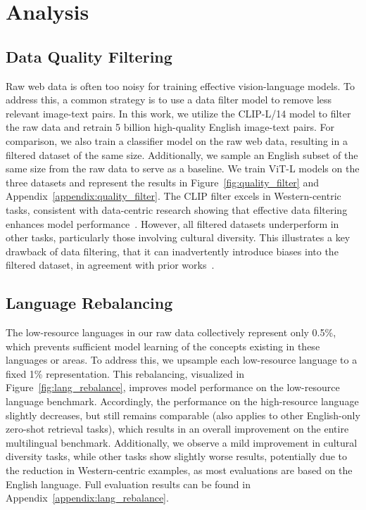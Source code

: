 \section{Analysis}

\subsection{Data Quality Filtering}
\label{sec:data_filter}

Raw web data is often too noisy for training effective vision-language models. To address this, a common strategy is to use a data filter model to remove less relevant image-text pairs. In this work, we utilize the CLIP-L/14 model to filter the raw data and retrain 5 billion high-quality English image-text pairs.
For comparison, we also train a classifier model on the raw web data, resulting in a filtered dataset of the same size. Additionally, we sample an English subset of the same size from the raw data to serve as a baseline.
We train ViT-L models on the three datasets and represent the results in Figure~\ref{fig:quality_filter} and Appendix~\ref{appendix:quality_filter}. The CLIP filter excels in Western-centric tasks, consistent with data-centric research showing that effective data filtering enhances model performance~\citep{fang2023data,cao2023less,maini2023t,abbas2023semdedup}. However, all filtered datasets underperform in other tasks, particularly those involving cultural diversity. This illustrates a key drawback of data filtering, that it can inadvertently introduce biases into the filtered dataset, in agreement with prior works~\citep{birhane2021multimodal,pouget2024no,garcia2023uncurated}.



\subsection{Language Rebalancing}
\label{sec:lang_rebalance}

The low-resource languages in our raw data collectively represent only 0.5\%, which prevents sufficient model learning of the concepts existing in these languages or areas. To address this, we upsample each low-resource language to a fixed 1\% representation. This rebalancing, visualized in Figure~\ref{fig:lang_rebalance}, improves model performance on the low-resource language benchmark. Accordingly, the performance on the high-resource language slightly decreases, but still remains comparable (also applies to other English-only zero-shot retrieval tasks), which results in an overall improvement on the entire multilingual benchmark. Additionally, we observe a mild improvement in cultural diversity tasks, while other tasks show slightly worse results, potentially due to the reduction in Western-centric examples, as most evaluations are based on the English language. Full evaluation results can be found in Appendix~\ref{appendix:lang_rebalance}.

